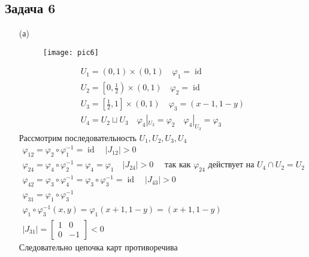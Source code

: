 \newpage
\subsection*{Задача 6}
\begin{enumerate}
\item[(а)]
	\begin{figure}[!h]
		\texttt{[image: pic6]}
	\end{figure}
	\begin{gather*}
		U_1 = (0,1) \times (0,1)\quad \varphi_1 = \operatorname{id}\\
		U_2 = \left[0, \frac{1}{2}\right) \times (0,1)\quad \varphi_2 = \operatorname{id}\\
		U_3 = \left[\frac{1}{2},1\right] \times (0,1)\quad \varphi_3 = (x-1, 1-y)\\
		U_4 = U_2 \sqcup U_3\quad \varphi_4 |_{U_2} = \varphi_2\quad \varphi_4|_{U_3} = \varphi_3
	\end{gather*}
	Рассмотрим последовательность $U_1, U_2, U_3, U_4$
	\begin{gather*}
		\varphi_{12} = \varphi_{2} \circ \varphi_{1}^{-1} = \operatorname{id}\quad |J_{12}|>0\\
		\varphi_{24} = \varphi_{4} \circ \varphi_{2}^{-1} = \varphi_{4} = \varphi_{1}\quad |J_{24}|>0\quad \text{ так как } \varphi_{24} \text{ действует на } U_4 \cap U_2 = U_2\\
		\varphi_{42} = \varphi_{3} \circ \varphi_{4}^{-1} = \varphi_{3} \circ \varphi_{3}^{-1} = \operatorname{id}\quad |J_{43}| > 0\\
		\varphi_{31} = \varphi_{1} \circ \varphi_{3}^{-1}\\
		\varphi_{1} \circ \varphi_{3}^{-1}(x,y) = \varphi_{1}(x+1,1-y) = (x+1,1-y)\\
		|J_{31}| = 
		\begin{bmatrix}
			1 & 0 \\ 0 & -1
		\end{bmatrix}
		< 0
	\end{gather*}
	Следовательно цепочка карт противоречива
	\vskip 0.3in


\end{enumerate}
